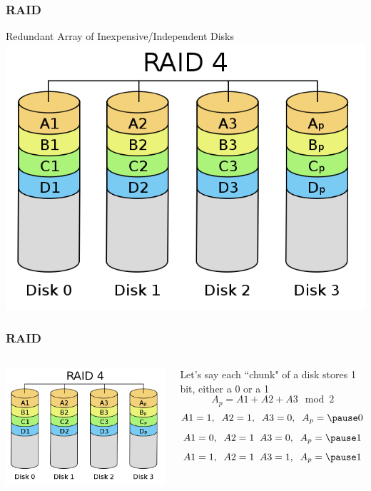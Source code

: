 \documentclass{beamer}
\theoremstyle{mystyle}
\begin{document}
\begin{frame}
\frametitle{RAID}

	\begin{center}
		Redundant Array of Inexpensive/Independent Disks
		\includegraphics[width=0.5\linewidth]{raid4}	
	\end{center}
\end{frame}


\begin{frame}
\frametitle{RAID}

\begin{columns}
		\begin{center}
			\vspace{-1in}
			\includegraphics[scale=0.15]{raid4}	
		\end{center}
		\begin{center}
		Let's say each ``chunk" of a disk stores 1 bit, either a 0 or a 1
		\pause
		\[A_p = A1 + A2 + A3 \mod 2\]
		\pause \[ A1 = 1, \; \; A2 = 1, \; \; A3 = 0, \;\;  A_p = \pause 0\]
		\pause \[ A1 = 0, \; \; A2 = 1 \;\; A3 = 0, \;\; A_p = \pause 1\]
		\pause \[ A1 = 1, \;\; A2 = 1 \;\; A3 = 1, \;\; A_p = \pause 1\]
		\end{center}
\end{columns}

\end{frame}
\end{document}
